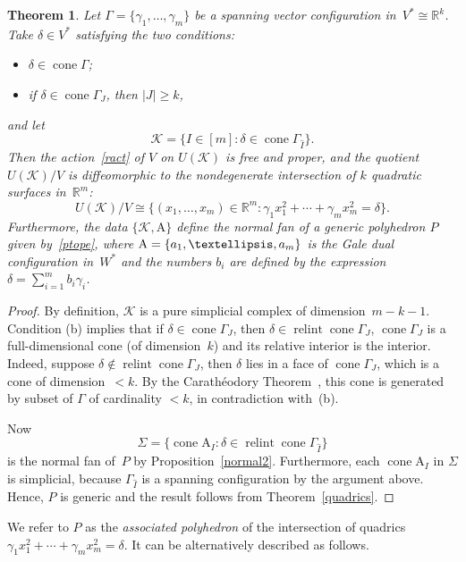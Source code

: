 \documentclass[a4paper]{amsart}
\newtheorem{theorem}{Theorem}[section]
\theoremstyle{definition}
\theoremstyle{remark}
\numberwithin{equation}{section}
\def\R{\mathbb R}
\def\R{\mathbb R}
\def\sK{\mathcal K}
\newcommand{\mb}[1]{{\textbf {\textit#1}}}
\renewcommand{\ge}{\geqslant}
\def\cone{\mathop{\mathrm{cone}}}
\def\relint{\mathop{\mathrm{relint}}}
\newcommand{\<}{\langle}
\renewcommand{\>}{\rangle}
\begin{document}
\begin{theorem}\label{quadrics1}
Let $\Gamma=\{\gamma_1,\ldots,\gamma_m\}$ be a spanning vector configuration in~$V^*\cong\R^{k}$. Take $\delta\in V^*$ satisfying the two conditions:
\begin{itemize}
\item[(a)] $\delta\in\cone\Gamma$;\\[-0.7\baselineskip]

\item[(b)]
if $\delta\in\cone\Gamma_J$, then $|J|\ge k$,
\end{itemize}
and let
\[
  \sK=\{I\in[m]\colon \delta\in\cone\Gamma_{\widehat I}\}.
\]
Then the action~\eqref{ract} of $V$ on $U(\sK)$ is free and proper, and the quotient $U(\sK)/V$ is diffeomorphic to the nondegenerate intersection of $k$ quadratic surfaces in~$\R^m$:
\[
  U(\sK)/V\cong\{(x_1,\ldots,x_m)\in\R^m\colon\gamma_1 x^2_1+ 
  \cdots+\gamma_mx^2_m=\delta\}.
\]
Furthermore,  the data $\{\mathcal K,\mathrm A\}$ define the normal fan of a generic polyhedron $P$ given by~\eqref{ptope}, where $\mathrm A=\{\mb a_1,\ldots,\mb a_m\}$ is the Gale dual configuration in~$W^*$ and
 the numbers $b_i$ are defined by the expression $\delta=\sum_{i=1}^mb_i\gamma_i$.
\end{theorem}
\begin{proof}
By definition, $\sK$ is a pure simplicial complex of dimension~$m-k-1$. 
Condition (b) implies that if $\delta\in\cone\Gamma_J$, then $\delta\in\relint\cone\Gamma_J$, $\cone\Gamma_J$ is a full-dimensional cone (of dimension~$k$) and its relative interior is the interior. Indeed, suppose $\delta\notin\relint\cone\Gamma_J$, then $\delta$ lies in a face of 
$\cone\Gamma_J$, which is a cone of dimension~$<k$. By the Carath\'eodory Theorem~\cite[Proposition~1.15]{zieg95}, this cone is generated by subset of $\Gamma$ of cardinality $<k$, in contradiction with~(b). 

Now
\[
  \Sigma=\{\cone \mathrm A_I\colon \delta\in\relint\cone\Gamma_{\widehat I}\}
\]
is the normal fan of~$P$ by Proposition~\ref{normal2}. Furthermore, each $\cone \mathrm A_I$ in $\Sigma$ is simplicial, because $\Gamma_{\widehat I}$ is a spanning configuration by the argument above. Hence, $P$ is generic and the result follows from Theorem~\ref{quadrics}.
\end{proof}

We refer to $P$ as the \emph{associated polyhedron} of the intersection of quadrics 
$\gamma_1 x^2_1+\cdots+\gamma_mx^2_m=\delta$. It can be alternatively described as follows.
\end{document}
